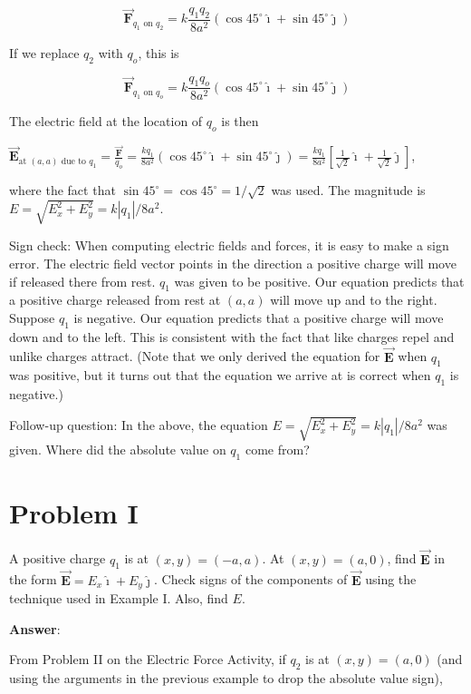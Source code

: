 \documentclass{article}
\newcommand{\ds}[0]{\displaystyle}
\newcommand{\ihat}[0]{\hat{\boldsymbol{\imath}}}
\newcommand{\jhat}[0]{\hat{\boldsymbol{\jmath}}}
\newcommand{\bfvec}[1]{\vec{\mathbf{#1}}}
\begin{document}
$$\bfvec{F}_{q_1\text{ on } q_2}=k\frac{q_1q_2}{8a^2}(\cos 45^\circ \ihat + \sin 45^\circ \jhat)$$

If we replace $q_2$ with $q_o$, this is

$$\bfvec{F}_{q_1\text{ on } q_o}=k\frac{q_1q_o}{8a^2}(\cos 45^\circ \ihat + \sin 45^\circ \jhat)$$

The electric field at the location of $q_o$ is then 

$\ds\bfvec{E}_{\text{at }(a,a) \text{ due to }q_1} = \frac{\bfvec{F}}{q_o} = \frac{kq_1}{8a^2}(\cos 45^\circ \ihat + \sin 45^\circ \jhat) =\frac{kq_1}{8a^2}\left[\frac{1}{\sqrt{2}}\ihat + \frac{1}{\sqrt{2}}\jhat\right]$,

where the fact that $\sin 45^\circ=\cos 45^\circ=1/\sqrt{2}$ was used. The magnitude is $E=\sqrt{E_x^2+E_y^2}=k|q_1|/8a^2$.

Sign check: When computing electric fields and forces, it is easy to make a sign error. The electric field vector points in the direction a positive charge will move if released there from rest. $q_1$ was given to be positive. Our equation predicts that a positive charge released from rest at $(a, a)$ will move up and to the right. Suppose $q_1$ is negative. Our equation predicts that a positive charge will move down and to the left. This is consistent with the fact that like charges repel and unlike charges attract. (Note that we only derived the equation for $\bfvec{E}$ when $q_1$ was positive, but it turns out that the equation we arrive at is correct when $q_1$ is negative.)

Follow-up question: In the above, the equation $E=\sqrt{E_x^2+E_y^2}=k|q_1|/8a^2$ was given. Where did the absolute value on $q_1$ come from?

\section{Problem I}

A positive charge $q_1$ is at $(x,y)=(-a,a)$. At $(x,y)=(a, 0)$, find $\bfvec{E}$ in the form $\bfvec{E}=E_x\ihat + E_y\jhat$. Check signs of the components of $\bfvec{E}$ using the technique used in Example I. Also, find $E$.



\ifsolutions
{\bf Answer}:

From Problem II on the Electric Force Activity, if $q_2$ is at $(x,y)=(a, 0)$ (and using the arguments in the previous example to drop the absolute value sign),
\end{document}
